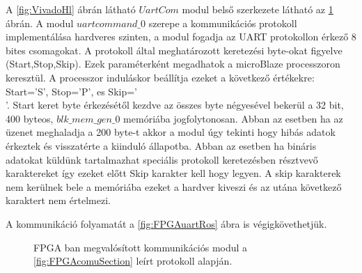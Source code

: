 A \ref{fig:VivadoHl} ábrán látható $UartCom$ modul belső szerkezete látható az \ref{fig:UartComVivaldo} ábrán. A modul $uartcommand\_0$ szerepe a kommunikációs protokoll implementálása hardveres szinten, a modul fogadja az UART protokollon  érkező 8 bites csomagokat. A protokoll által meghatározott keretezési byte-okat figyelve (Start,Stop,Skip). Ezek paraméterként megadhatok a microBlaze processzoron keresztül. A processzor induláskor beállítja ezeket a következő értékekre: Start='S', Stop='P', es Skip='\\'. 
Start keret byte érkezésétől kezdve az összes byte négyesével bekerül a 32 bit, 400 byteos, $blk\_mem\_gen\_0$ memóriába jogfolytonosan. Abban az esetben ha az üzenet meghaladja a 200 byte-t akkor a modul úgy tekinti hogy hibás adatok érkeztek és visszatérte a kiinduló állapotba. Abban az esetben ha bináris adatokat küldünk tartalmazhat speciális protokoll keretezésben résztvevő karaktereket így ezeket előtt Skip karakter kell hogy legyen. A skip karakterek nem kerülnek bele a memóriába ezeket a hardver kiveszi és az utána következő karaktert nem értelmezi.

A kommunikáció folyamatát a \ref{fig:FPGAuartRos} ábra is végigkövethetjük.

\begin{figure}[H]		
  \caption{FPGA ban megvalósított kommunikációs modul a 	     \ref{fig:FPGAcomuSection} leírt protokoll alapján.}
  \label{fig:UartComVivaldo}
\end{figure}



